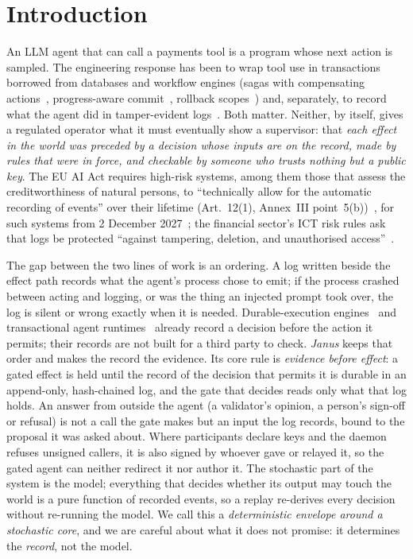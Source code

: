 \section{Introduction}
\label{sec:intro}


An LLM agent that can call a payments tool is a program whose next action is
sampled. The engineering response has been to wrap tool use in transactions
borrowed from databases and workflow engines (sagas with compensating
actions~\cite{sagas,sagallm}, progress-aware commit~\cite{atomix}, rollback
scopes~\cite{cordon,agentrewind}) and, separately, to record what the agent did
in tamper-evident logs~\cite{novafabric,agentflightrecorder,righttohistory}. Both
matter. Neither, by itself, gives a regulated operator what it must eventually
show a supervisor: that \emph{each effect in the world was preceded by a
decision whose inputs are on the record, made by rules that were in force, and
checkable by someone who trusts nothing but a public key}. The EU AI Act
requires high-risk systems, among them those that assess the creditworthiness of
natural persons, to ``technically allow for the automatic recording of events''
over their lifetime (Art.~12(1), Annex~III point~5(b))~\cite{euaiact}, for such
systems from 2 December 2027~\cite{euaiomnibus}; the financial sector's ICT
risk rules ask that logs be protected ``against tampering, deletion, and
unauthorised access''~\cite{dorarts,dora}.

The gap between the two lines of work is an ordering. A log written beside the
effect path records what the agent's process chose to emit; if the process
crashed between acting and logging, or was the thing an injected prompt took
over, the log is silent or wrong exactly when it is needed. Durable-execution
engines~\cite{temporal} and transactional agent runtimes~\cite{mnemosyne,authoritycommit}
already record a decision before the action it permits; their records are not
built for a third party to check. \emph{Janus} keeps that order and makes the
record the evidence. Its core rule is \emph{evidence before effect}: a gated effect is held
until the record of the decision that permits it is durable in an append-only,
hash-chained log, and the gate that decides reads only what that log holds. An
answer from outside the agent (a validator's opinion, a person's sign-off or
refusal) is not a call the gate makes but an input the log records, bound to the
proposal it was asked about. Where participants declare keys and the daemon
refuses unsigned callers, it is also signed by whoever gave or relayed it, so the
gated agent can neither redirect it nor author it. The stochastic part of the system is the
model; everything that decides whether its output may touch the world is a pure
function of recorded events, so a replay re-derives every decision without
re-running the model. We call this a \emph{deterministic envelope around a
stochastic core}, and we are careful about what it does not promise: it
determines the \emph{record}, not the model.

